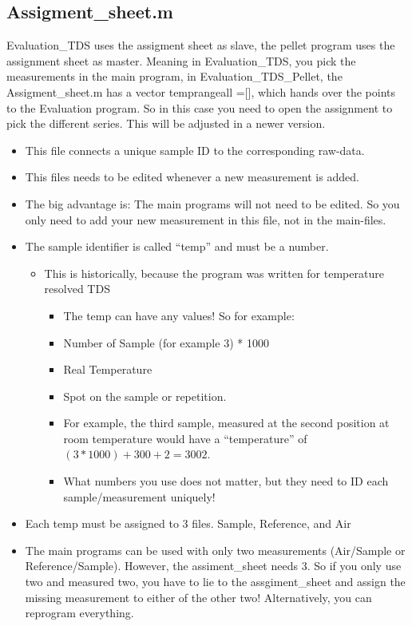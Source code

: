\documentclass[12pt]{article}
\begin{document}
\subsection{Assigment\_sheet.m}
Evaluation\_TDS uses the assigment sheet as slave, the pellet program uses the assignment sheet as master. Meaning in Evaluation\_TDS, you pick the measurements in the main program, in Evaluation\_TDS\_Pellet, the Assigment\_sheet.m has a vector temprangeall =[], which hands over the points to the Evaluation program. So in this case you need to open the assignment to pick the different series. This will be adjusted in a newer version. 

\begin{itemize}
	\item 	This file connects a unique sample ID to the corresponding raw-data. 
\item	This files needs to be edited whenever a new measurement is added.
\item The big advantage is: The main programs will not need to be edited. So you only need to add your new measurement in this file, not in the main-files.
\item	The sample identifier is called "`temp"' and must be a number. 
\begin{itemize}
	\item 	This is historically, because the program was written for temperature resolved TDS 
\begin{itemize}
\item	The temp can have any values! So for example: 
\item	Number of Sample (for example 3) * 1000
\item	Real Temperature
\item Spot on the sample or repetition.
\item	For example, the third sample, measured at the second position at room temperature would have a "`temperature"' of $(3*1000) + 300 + 2 =3002$. 
\item	What numbers you use does not matter, but they need to ID each sample/measurement uniquely! 
\end{itemize}
\end{itemize}
\item	Each temp must be assigned to 3 files. Sample, Reference, and Air
\item	The main programs can be used with only two measurements (Air/Sample or Reference/Sample). However, the assiment\_sheet needs  3. So if you only use two and measured two, you have to lie to the assgiment\_sheet and assign the missing measurement to either of the other two! Alternatively, you can reprogram everything. 

\end{itemize}
\end{document}
